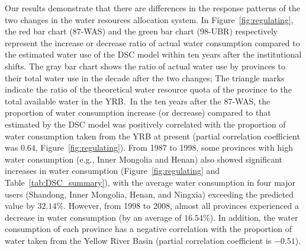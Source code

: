 Our results demonstrate that there are differences in the response patterns of the two changes in the water resources allocation system.
In Figure~\ref{fig:regulating}, the red bar chart (87-WAS) and the green bar chart (98-UBR) respectively represent the increase or decrease ratio of actual water consumption compared to the estimated water use of the DSC model within ten years after the institutional shifts.
The gray bar chart shows the ratio of actual water use by provinces to their total water use in the decade after the two changes; The triangle marks indicate the ratio of the theoretical water resource quota of the province to the total available water in the YRB.\
In the ten years after the 87-WAS, the proportion of water consumption increase (or decrease) compared to that estimated by the DSC model was positively correlated with the proportion of water consumption taken from the YRB at present (partial correlation coefficient was $0.64$, Figure~\ref{fig:regulating}).
From 1987 to 1998, some provinces with high water consumption (e.g., Inner Mongolia and Henan) also showed significant increases in water consumption (Figure~\ref{fig:regulating} and Table~\ref{tab:DSC_summary}), with the average water consumption in four major users (Shandong, Inner Mongolia, Henan, and Ningxia) exceeding the predicted value by $32.14\%$.
However, from 1998 to 2008, almost all provinces experienced a decrease in water consumption (by an average of $16.54\%$).
In addition, the water consumption of each province has a negative correlation with the proportion of water taken from the Yellow River Basin (partial correlation coefficient is $-0.51$).


